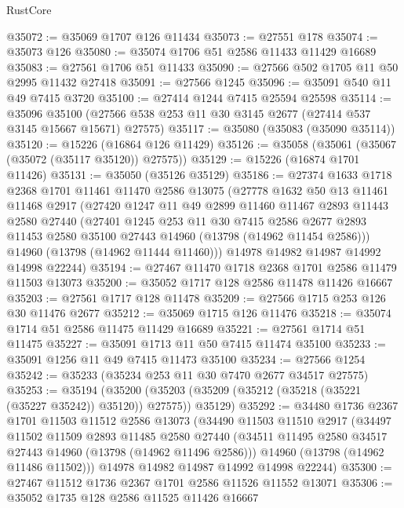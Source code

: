 \begin{lexlean}{RustCore}
\begin{coremodule}
@35072 := @35069 @1707 @126 @11434
@35073 := @27551 @178
@35074 := @35073 @126
@35080 := @35074 @1706 @51 @2586 @11433 @11429 @16689
@35083 := @27561 @1706 @51 @11433
@35090 := @27566 @502 @1705 @11 @50 @2995 @11432 @27418
@35091 := @27566 @1245
@35096 := @35091 @540 @11 @49 @7415 @3720
@35100 := @27414 @1244 @7415 @25594 @25598
@35114 := @35096
    @35100
    (@27566 @538 @253 @11 @30 @3145 @2677 (@27414 @537 @3145 @15667 @15671) @27575)
@35117 := @35080 (@35083 (@35090 @35114))
@35120 := @15226 (@16864 @126 @11429)
@35126 := @35058 (@35061 (@35067 (@35072 (@35117 @35120)) @27575))
@35129 := @15226 (@16874 @1701 @11426)
@35131 := @35050 (@35126 @35129)
@35186 := @27374
    @1633
    @1718
    @2368
    @1701
    @11461
    @11470
    @2586
    @13075
    (@27778
      @1632
      @50
      @13
      @11461
      @11468
      @2917
      (@27420
        @1247
        @11
        @49
        @2899
        @11460
        @11467
        @2893
        @11443
        @2580
        @27440
        (@27401
          @1245
          @253
          @11
          @30
          @7415
          @2586
          @2677
          @2893
          @11453
          @2580
          @35100
          @27443
          @14960
          (@13798 (@14962 @11454 @2586)))
        @14960
        (@13798 (@14962 @11444 @11460)))
      @14978
      @14982
      @14987
      @14992
      @14998
      @22244)
@35194 := @27467 @11470 @1718 @2368 @1701 @2586 @11479 @11503 @13073
@35200 := @35052 @1717 @128 @2586 @11478 @11426 @16667
@35203 := @27561 @1717 @128 @11478
@35209 := @27566 @1715 @253 @126 @30 @11476 @2677
@35212 := @35069 @1715 @126 @11476
@35218 := @35074 @1714 @51 @2586 @11475 @11429 @16689
@35221 := @27561 @1714 @51 @11475
@35227 := @35091 @1713 @11 @50 @7415 @11474 @35100
@35233 := @35091 @1256 @11 @49 @7415 @11473 @35100
@35234 := @27566 @1254
@35242 := @35233 (@35234 @253 @11 @30 @7470 @2677 @34517 @27575)
@35253 := @35194
    (@35200 (@35203 (@35209 (@35212 (@35218 (@35221 (@35227 @35242)) @35120)) @27575)) @35129)
@35292 := @34480
    @1736
    @2367
    @1701
    @11503
    @11512
    @2586
    @13073
    (@34490
      @11503
      @11510
      @2917
      (@34497
        @11502
        @11509
        @2893
        @11485
        @2580
        @27440
        (@34511 @11495 @2580 @34517 @27443 @14960 (@13798 (@14962 @11496 @2586)))
        @14960
        (@13798 (@14962 @11486 @11502)))
      @14978
      @14982
      @14987
      @14992
      @14998
      @22244)
@35300 := @27467 @11512 @1736 @2367 @1701 @2586 @11526 @11552 @13071
@35306 := @35052 @1735 @128 @2586 @11525 @11426 @16667

\end{coremodule}
\end{lexlean}
